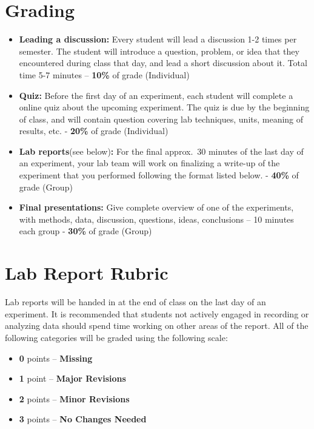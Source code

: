 \section*{Grading}
\begin{itemize}
\itemsep0em
\item \textbf{Leading a discussion:} Every student will lead a discussion 1-2 times per semester. The student will introduce a question, problem, or idea that they encountered during class that day, and lead a short discussion about it. Total time 5-7 minutes – \textbf{10\%} of grade (Individual)
\item \textbf{Quiz:}  Before the first day of an experiment, each student will complete a online quiz about the upcoming experiment. The quiz is due by the beginning of class, and will contain question covering lab techniques, units, meaning of results, etc. - \textbf{20\%} of grade (Individual)
\item \textbf{Lab reports}(see below)\textbf{:} For the final approx.\ 30 minutes of the last day of an experiment, your lab team will work on finalizing a write-up of the experiment that you performed following the format listed below. - \textbf{40\%} of grade (Group)
\item \textbf{Final presentations:} Give complete overview of one of the experiments, with methods, data, discussion, questions, ideas, conclusions – 10 minutes each group - \textbf{30\%} of grade (Group)
\end{itemize}

\newpage

\section*{Lab Report Rubric}
Lab reports will be handed in at the end of class on the last day of an experiment. It is recommended that students not actively engaged in recording or analyzing data should spend time working on other areas of the report. All of the following categories will be graded using the following scale:
\begin{itemize}
\itemsep0em
\item \textbf{0} points – \textbf{Missing}
\item \textbf{1} point – \textbf{Major Revisions} 
\item \textbf{2} points – \textbf{Minor Revisions} 
\item \textbf{3} points – \textbf{No Changes Needed}
\end{itemize}

